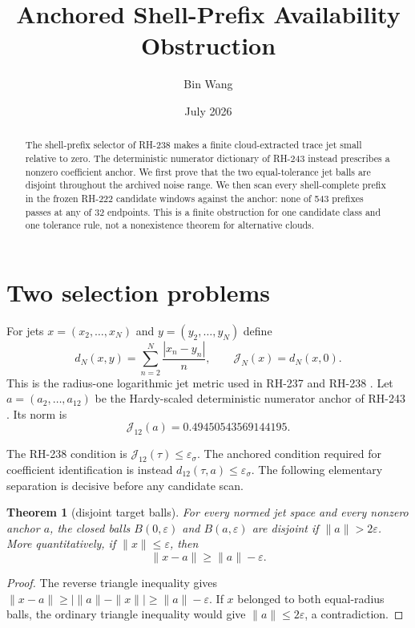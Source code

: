 \documentclass[11pt]{article}
\title{Anchored Shell-Prefix Availability Obstruction}
\author{Bin Wang}
\date{July 2026}
\newtheorem{theorem}{Theorem}
\newcommand{\J}{\mathcal J}
\begin{document}
\maketitle

\begin{abstract}
The shell-prefix selector of RH-238 makes a finite cloud-extracted trace jet
small relative to zero.  The deterministic numerator dictionary of RH-243
instead prescribes a nonzero coefficient anchor.  We first prove that the two
equal-tolerance jet balls are disjoint throughout the archived noise range.
We then scan every shell-complete prefix in the frozen RH-222 candidate
windows against the anchor: none of 543 prefixes passes at any of 32
endpoints.  This is a finite obstruction for one candidate class and one
tolerance rule, not a nonexistence theorem for alternative clouds.
\end{abstract}

\section{Two selection problems}

For jets $x=(x_2,\ldots,x_N)$ and $y=(y_2,\ldots,y_N)$ define
\[
 d_N(x,y)=\sum_{n=2}^{N}\frac{|x_n-y_n|}{n},
 \qquad \J_N(x)=d_N(x,0).
\]
This is the radius-one logarithmic jet metric used in RH-237 and RH-238
\citep{WangRH238}.  Let $a=(a_2,\ldots,a_{12})$ be the Hardy-scaled
deterministic numerator anchor of RH-243 \citep{WangRH243}.  Its norm is
\begin{equation}\label{eq:anchor-norm}
 \J_{12}(a)=0.49450543569144195.
\end{equation}

The RH-238 condition is $\J_{12}(\tau)\le\varepsilon_\sigma$.  The anchored
condition required for coefficient identification is instead
$d_{12}(\tau,a)\le\varepsilon_\sigma$.  The following elementary separation
is decisive before any candidate scan.

\begin{theorem}[disjoint target balls]\label{thm:balls}
For every normed jet space and every nonzero anchor $a$, the closed balls
$B(0,\varepsilon)$ and $B(a,\varepsilon)$ are disjoint if
$\|a\|>2\varepsilon$.  More quantitatively, if $\|x\|\le\varepsilon$, then
\[
 \|x-a\|\ge \|a\|-\varepsilon.
\]
\end{theorem}

\begin{proof}
The reverse triangle inequality gives
$\|x-a\|\ge|\|a\|-\|x\||\ge\|a\|-\varepsilon$.  If $x$ belonged to both
equal-radius balls, the ordinary triangle inequality would give
$\|a\|\le2\varepsilon$, a contradiction.
\end{proof}
\end{document}
